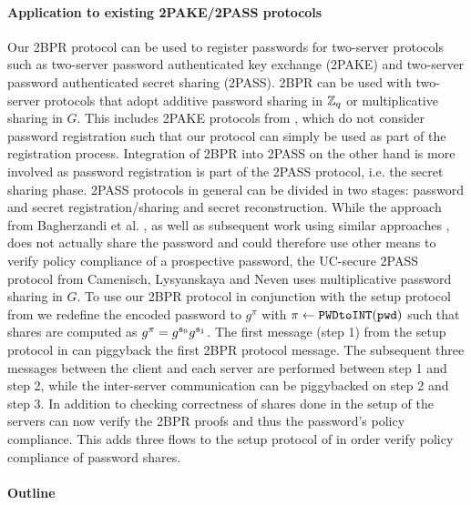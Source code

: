 \paragraph{Application to existing 2PAKE/2PASS protocols}
Our 2BPR protocol can be used to register passwords for two-server protocols such as two-server password authenticated key exchange (2PAKE) and two-server password authenticated secret sharing (2PASS).
2BPR can be used with two-server protocols that adopt additive password sharing in $\mathbb{Z}_q$ or multiplicative sharing in $G$.
This includes 2PAKE protocols from \cite{Katz2005,Kiefer14}, which do not consider password registration such that our protocol can simply be used as part of the registration process.
Integration of 2BPR into 2PASS on the other hand is more involved as password registration is part of the 2PASS protocol, i.e. the secret sharing phase.
2PASS protocols in general can be divided in two stages: password and secret registration/sharing and secret reconstruction.
While the approach from Bagherzandi et al. \cite{Bagherzandi2011}, as well as subsequent work using similar approaches \cite{PryvalovK14,CamenischLLN14,JareckiKK14}, does not actually share the password and could therefore use other means to verify policy compliance of a prospective password, the UC-secure 2PASS protocol from Camenisch, Lysyanskaya and Neven \cite{CamenischLN2012} uses multiplicative password sharing in $G$.
To use our 2BPR protocol in conjunction with the setup protocol from \cite{CamenischLN2012} we redefine the encoded password to $g^{\pi}$ with $\pi\gets\texttt{PWDtoINT}(\mathtt{pwd})$ such that shares are computed as $g^{\pi}=g^{\mathfrak{s}_0}g^{\mathfrak{s}_1}$.
The first message (step 1) from the setup protocol in \cite{CamenischLN2012} can piggyback the first 2BPR protocol message.
The subsequent three messages between the client and each server are performed between step 1 and step 2, while the inter-server communication can be piggybacked on step 2 and step 3.
In addition to checking correctness of shares done in the setup of \cite{CamenischLN2012} the servers can now verify the 2BPR proofs and thus the password's policy compliance.
This adds three flows to the setup protocol of \cite{CamenischLN2012} in order verify policy compliance of password shares.

\paragraph{Outline}
\hfill\\

